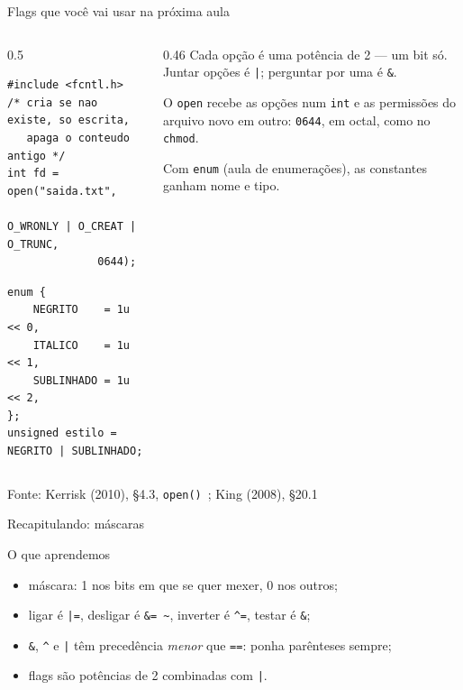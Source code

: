 \documentclass[aspectratio=169]{beamer}
\newcommand{\til}{\textasciitilde}
\newcommand{\cir}{\textasciicircum}
\newcommand{\fonte}[1]{\vfill\hfill{\scriptsize\textcolor{UFSGray}{Fonte: #1}}}
\begin{document}
\begin{frame}[fragile]{Flags que você vai usar na próxima aula}
  \begin{columns}[c]
    \begin{column}{0.5\textwidth}
\begin{lstlisting}[style=codC]
#include <fcntl.h>
/* cria se nao existe, so escrita,
   apaga o conteudo antigo */
int fd = open("saida.txt",
              O_WRONLY | O_CREAT | O_TRUNC,
              0644);
\end{lstlisting}
\begin{lstlisting}[style=codC]
enum {
    NEGRITO    = 1u << 0,
    ITALICO    = 1u << 1,
    SUBLINHADO = 1u << 2,
};
unsigned estilo = NEGRITO | SUBLINHADO;
\end{lstlisting}
    \end{column}
    \begin{column}{0.46\textwidth}
      \small Cada opção é uma potência de 2 --- um bit só. Juntar opções é
      \texttt{|}; perguntar por uma é \texttt{\&}.

      \medskip
      O \texttt{open} recebe as opções num \texttt{int} e as permissões do
      arquivo novo em outro: \texttt{0644}, em octal, como no
      \texttt{chmod}.

      \medskip
      Com \texttt{enum} (aula de enumerações), as constantes ganham nome e
      tipo.
    \end{column}
  \end{columns}
  \fonte{Kerrisk (2010), §4.3, \texttt{open()}~\cite{kerrisk2010linux};
    King (2008), §20.1~\cite{king2008c}}
\end{frame}

\begin{frame}{Recapitulando: máscaras}
  \begin{block}{O que aprendemos}
    \begin{itemize}
      \item máscara: 1 nos bits em que se quer mexer, 0 nos outros;
      \item ligar é \texttt{|=}, desligar é \texttt{\&= \til}, inverter é
        \texttt{\cir=}, testar é \texttt{\&};
      \item \texttt{\&}, \texttt{\cir} e \texttt{|} têm precedência
        \emph{menor} que \texttt{==}: ponha parênteses sempre;
      \item flags são potências de 2 combinadas com \texttt{|}.
    \end{itemize}
  \end{block}
\end{frame}
\end{document}
